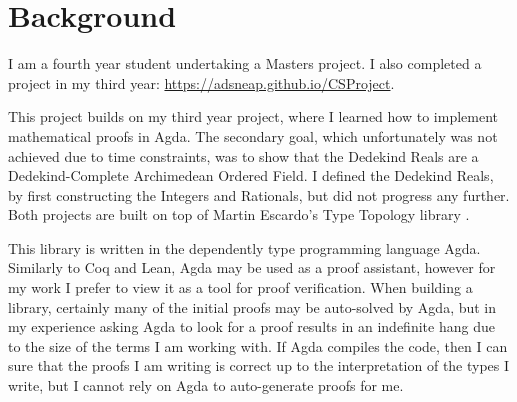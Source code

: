 \documentclass[ProjectReport]{subfiles}
\begin{document}
\section{Background}

I am a fourth year student undertaking a Masters project. I also completed a project in my third year: \url{https://adsneap.github.io/CSProject}.

This project builds on my third year project, where I learned how to implement mathematical proofs in Agda. The secondary goal, which unfortunately was not achieved due to time constraints, was to show that the Dedekind Reals are a Dedekind-Complete Archimedean Ordered Field. I defined the Dedekind Reals, by first constructing the Integers and Rationals, but did not progress any further. Both projects are built on top of Martin Escardo's Type Topology library \cite{TypeTopology}.

This library is written in the dependently type programming language Agda. Similarly to Coq and Lean, Agda may be used as a proof assistant, however for my work I prefer to view it as a tool for proof verification. When building a library, certainly many of the initial proofs may be auto-solved by Agda, but in my experience asking Agda to look for a proof results in an indefinite hang due to the size of the terms I am working with. If Agda compiles the code, then I can sure that the proofs I am writing is correct up to the interpretation of the types I write, but I cannot rely on Agda to auto-generate proofs for me.
\end{document}

